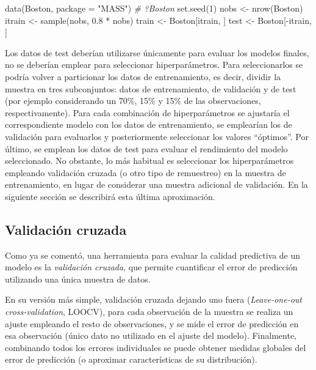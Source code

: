\documentclass[
]{book}
\newenvironment{Shaded}{\begin{snugshade}}{\end{snugshade}}
\newcommand{\AttributeTok}[1]{\textcolor[rgb]{0.77,0.63,0.00}{#1}}
\newcommand{\CommentTok}[1]{\textcolor[rgb]{0.56,0.35,0.01}{\textit{#1}}}
\newcommand{\DecValTok}[1]{\textcolor[rgb]{0.00,0.00,0.81}{#1}}
\newcommand{\FloatTok}[1]{\textcolor[rgb]{0.00,0.00,0.81}{#1}}
\newcommand{\FunctionTok}[1]{\textcolor[rgb]{0.00,0.00,0.00}{#1}}
\newcommand{\NormalTok}[1]{#1}
\newcommand{\OtherTok}[1]{\textcolor[rgb]{0.56,0.35,0.01}{#1}}
\newcommand{\SpecialCharTok}[1]{\textcolor[rgb]{0.00,0.00,0.00}{#1}}
\newcommand{\StringTok}[1]{\textcolor[rgb]{0.31,0.60,0.02}{#1}}
\theoremstyle{break}
\theoremstyle{definition}
\theoremstyle{definition}
\theoremstyle{definition}
\theoremstyle{definition}
\theoremstyle{remark}
\begin{document}
\begin{Shaded}
\begin{Highlighting}[]
\FunctionTok{data}\NormalTok{(Boston, }\AttributeTok{package =} \StringTok{"MASS"}\NormalTok{)}
\CommentTok{\# ?Boston}
\FunctionTok{set.seed}\NormalTok{(}\DecValTok{1}\NormalTok{)}
\NormalTok{nobs }\OtherTok{\textless{}{-}} \FunctionTok{nrow}\NormalTok{(Boston)}
\NormalTok{itrain }\OtherTok{\textless{}{-}} \FunctionTok{sample}\NormalTok{(nobs, }\FloatTok{0.8} \SpecialCharTok{*}\NormalTok{ nobs)}
\NormalTok{train }\OtherTok{\textless{}{-}}\NormalTok{ Boston[itrain, ]}
\NormalTok{test }\OtherTok{\textless{}{-}}\NormalTok{ Boston[}\SpecialCharTok{{-}}\NormalTok{itrain, ]}
\end{Highlighting}
\end{Shaded}

Los datos de test deberían utilizarse únicamente para evaluar los modelos finales, no se deberían emplear para seleccionar hiperparámetros.
Para seleccionarlos se podría volver a particionar los datos de entrenamiento, es decir, dividir la muestra en tres subconjuntos: datos de entrenamiento, de validación y de test (por ejemplo considerando un 70\%, 15\% y 15\% de las observaciones, respectivamente).
Para cada combinación de hiperparámetros se ajustaría el correspondiente modelo con los datos de entrenamiento, se emplearían los de validación para evaluarlos y posteriormente seleccionar los valores ``óptimos''. Por último, se emplean los datos de test para evaluar el rendimiento del modelo seleccionado.
No obstante, lo más habitual es seleccionar los hiperparámetros empleando validación cruzada (o otro tipo de remuestreo) en la muestra de entrenamiento, en lugar de considerar una muestra adicional de validación.
En la siguiente sección se describirá esta última aproximación.

\hypertarget{cv}{%
\subsection{Validación cruzada}\label{cv}}

Como ya se comentó, una herramienta para evaluar la calidad predictiva de un modelo es la \emph{validación cruzada}, que permite cuantificar el error de predicción utilizando una única muestra de datos.

En su versión más simple, validación cruzada dejando uno fuera (\emph{Leave-one-out cross-validation}, LOOCV), para cada observación de la muestra se realiza un ajuste empleando el resto de observaciones, y se mide el error de predicción en esa observación (único dato no utilizado en el ajuste del modelo).
Finalmente, combinando todos los errores individuales se puede obtener medidas globales del error de predicción (o aproximar características de su distribución).
\end{document}

